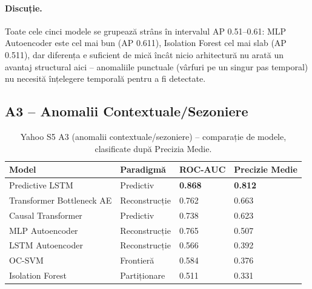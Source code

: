 \paragraph{Discuție.} Toate cele cinci modele se grupează strâns în intervalul AP 0.51--0.61: MLP Autoencoder este cel mai bun (AP 0.611), Isolation Forest cel mai slab (AP 0.511), dar diferența e suficient de mică încât nicio arhitectură nu arată un avantaj structural aici -- anomaliile punctuale (vârfuri pe un singur pas temporal) nu necesită înțelegere temporală pentru a fi detectate.

\subsection{A3 -- Anomalii Contextuale/Sezoniere}

\begin{table}[h]
\centering
\footnotesize
\begin{tabular}{@{}llll@{}}
\toprule
Model & Paradigmă & ROC-AUC & Precizie Medie \\
\midrule
Predictive LSTM            & Predictiv     & \textbf{0.868} & \textbf{0.812} \\
Transformer Bottleneck AE  & Reconstrucție & 0.762          & 0.663 \\
Causal Transformer         & Predictiv     & 0.738          & 0.623 \\
MLP Autoencoder            & Reconstrucție & 0.765          & 0.507 \\
LSTM Autoencoder           & Reconstrucție & 0.566          & 0.392 \\
OC-SVM                     & Frontieră       & 0.584          & 0.376 \\
Isolation Forest           & Partiționare      & 0.511          & 0.331 \\
\bottomrule
\end{tabular}
\caption{Yahoo S5 A3 (anomalii contextuale/sezoniere) -- comparație de modele, clasificate după Precizia Medie.}
\label{tab:yahoo-a3}
\end{table}

